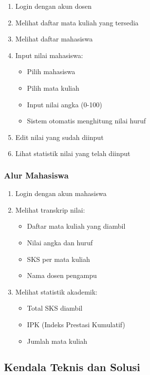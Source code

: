 \documentclass[12pt,a4paper]{article}
\begin{document}
\begin{enumerate}
    \item Login dengan akun dosen
    \item Melihat daftar mata kuliah yang tersedia
    \item Melihat daftar mahasiswa
    \item Input nilai mahasiswa:
    \begin{itemize}
        \item Pilih mahasiswa
        \item Pilih mata kuliah
        \item Input nilai angka (0-100)
        \item Sistem otomatis menghitung nilai huruf
    \end{itemize}
    \item Edit nilai yang sudah diinput
    \item Lihat statistik nilai yang telah diinput
\end{enumerate}

\subsubsection{Alur Mahasiswa}

\begin{enumerate}
    \item Login dengan akun mahasiswa
    \item Melihat transkrip nilai:
    \begin{itemize}
        \item Daftar mata kuliah yang diambil
        \item Nilai angka dan huruf
        \item SKS per mata kuliah
        \item Nama dosen pengampu
    \end{itemize}
    \item Melihat statistik akademik:
    \begin{itemize}
        \item Total SKS diambil
        \item IPK (Indeks Prestasi Kumulatif)
        \item Jumlah mata kuliah
    \end{itemize}
\end{enumerate}

\subsection{Kendala Teknis dan Solusi}
\end{document}
